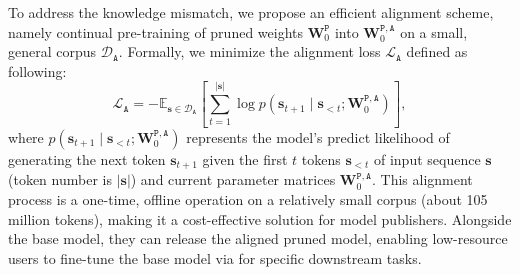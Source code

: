 To address the knowledge mismatch, 
we propose an efficient alignment scheme, namely continual pre-training of pruned weights $\mathbf{W}_{0}^\mathtt{P}$ into $\mathbf{W}_0^\mathtt{P,A}$ on a small, general corpus $\mathcal{D}_\mathtt{A}$.
Formally, we minimize the alignment loss $\mathcal{L}_{\mathtt{A}}$ defined as following: 
\begin{equation}
\mathcal{L}_{\mathtt{A}}=-\mathbb{E}_{\mathbf{s} \in \mathcal{D}_\mathtt{A}}\left[\sum_{t=1}^{|\mathbf{s}|} \log p \left(\mathbf{s}_{t+1} \mid \mathbf{s}_{<t};\mathbf{W}_{0}^\mathtt{P,A}\right)\right],
\end{equation}
where $p(\mathbf{s}_{t+1} \mid \mathbf{s}_{<t};\mathbf{W}_{0}^\mathtt{P,A})$ represents the model's predict likelihood of generating the next token $\mathbf{s}_{t+1}$ given the first $t$ tokens $\mathbf{s}_{<t}$ of input sequence $\mathbf{s}$ (token number is $|\mathbf{s}|$) and current parameter matrices $\mathbf{W}_{0}^\mathtt{P,A}$.
This alignment process is a one-time, offline operation on a relatively small corpus (about 105 million tokens), making it a cost-effective solution for model publishers. Alongside the base model, they can release the aligned pruned model, enabling low-resource users to fine-tune the base model via \method for specific downstream tasks.




